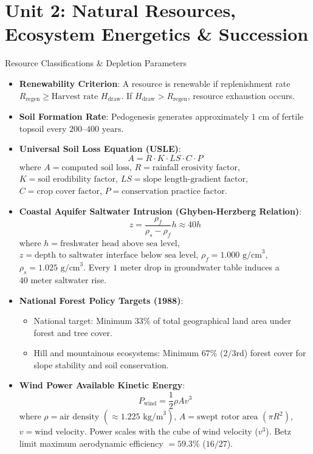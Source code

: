 \chapter{Unit 2: Natural Resources, Ecosystem Energetics \& Succession}

\begin{formulabox}{Resource Classifications \& Depletion Parameters}
\begin{itemize}[leftmargin=1.2em]
    \item \textbf{Renewability Criterion}: A resource is renewable if replenishment rate $R_{\text{regen}} \ge \text{Harvest rate } H_{\text{draw}}$. If $H_{\text{draw}} > R_{\text{regen}}$, resource exhaustion occurs.
    \item \textbf{Soil Formation Rate}: Pedogenesis generates approximately $1\text{ cm}$ of fertile topsoil every $200\text{--}400\text{ years}$.
    \item \textbf{Universal Soil Loss Equation (USLE)}:
    \begin{equation}
    A = R \cdot K \cdot LS \cdot C \cdot P
    \end{equation}
    where $A = \text{computed soil loss}$, $R = \text{rainfall erosivity factor}$, $K = \text{soil erodibility factor}$, $LS = \text{slope length-gradient factor}$, $C = \text{crop cover factor}$, $P = \text{conservation practice factor}$.
    \item \textbf{Coastal Aquifer Saltwater Intrusion (Ghyben-Herzberg Relation)}:
    \begin{equation}
    z = \frac{\rho_f}{\rho_s - \rho_f} h \approx 40 h
    \end{equation}
    where $h = \text{freshwater head above sea level}$, $z = \text{depth to saltwater interface below sea level}$, $\rho_f = 1.000\text{ g/cm}^3$, $\rho_s = 1.025\text{ g/cm}^3$. Every $1\text{ meter}$ drop in groundwater table induces a $40\text{ meter}$ saltwater rise.
    \item \textbf{National Forest Policy Targets (1988)}:
    \begin{itemize}
        \item National target: Minimum $33\%$ of total geographical land area under forest and tree cover.
        \item Hill and mountainous ecosystems: Minimum $67\%$ ($2/3\text{rd}$) forest cover for slope stability and soil conservation.
    \end{itemize}
    \item \textbf{Wind Power Available Kinetic Energy}:
    \begin{equation}
    P_{\text{wind}} = \frac{1}{2}\rho A v^3
    \end{equation}
    where $\rho = \text{air density } (\approx 1.225\text{ kg/m}^3)$, $A = \text{swept rotor area } (\pi R^2)$, $v = \text{wind velocity}$. Power scales with the cube of wind velocity ($v^3$). Betz limit maximum aerodynamic efficiency $= 59.3\%$ ($16/27$).
\end{itemize}
\end{formulabox}

